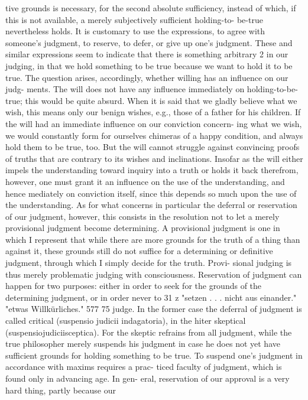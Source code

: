 tive grounds is necessary, for the second absolute sufficiency, instead of
which, if this is not available, a merely subjectively sufficient holding-to-
be-true nevertheless holds.
It is customary to use the expressions, to agree with someone's judgment, to
reserve, to defer, or give up one's judgment. These and similar expressions
seem to indicate that there is something arbitrary 2 in our judging, in that
we hold something to be true because we want to hold it to be true. The
question arises, accordingly, whether willing has an influence on our judg-
ments.
The will does not have any influence immediately on holding-to-be-
true; this would be quite absurd. When it is said that we gladly believe what
we wish, this means only our benign wishes, e.g., those of a father for his
children. If the will had an immediate influence on our conviction concern-
ing what we wish, we would constantly form for ourselves chimeras of a
happy condition, and always hold them to be true, too. But the will cannot
struggle against convincing proofs of truths that are contrary to its wishes
and inclinations.
Insofar as the will either impels the understanding toward inquiry into a
truth or holds it back therefrom, however, one must grant it an influence
on the use of the understanding, and hence mediately on conviction itself,
since this depends so much upon the use of the understanding.
As for what concerns in particular the deferral or reservation of our
judgment, however, this consists in the resolution not to let a merely
provisional judgment become determining. A provisional judgment is one in
which I represent that while there are more grounds for the truth of a
thing than against it, these grounds still do not suffice for a determining or
definitive judgment, through which I simply decide for the truth. Provi-
sional judging is thus merely problematic judging with consciousness.
Reservation of judgment can happen for two purposes: either in order to
seek for the grounds of the determining judgment, or in order never to
31
z
"setzen . . . nicht aus einander."
"etwas Willkürliches."
577
75
judge. In the former case the deferral of judgment is called critical
(suspensio judicii indagatoria), in the hiter skeptical (suspensiojudiciisceptica).
For the skeptic refrains from all judgment, while the true philosopher
merely suspends his judgment in case he does not yet have sufficient
grounds for holding something to be true.
To suspend one's judgment in accordance with maxims requires a prac-
ticed faculty of judgment, which is found only in advancing age. In gen-
eral, reservation of our approval is a very hard thing, partly because our
